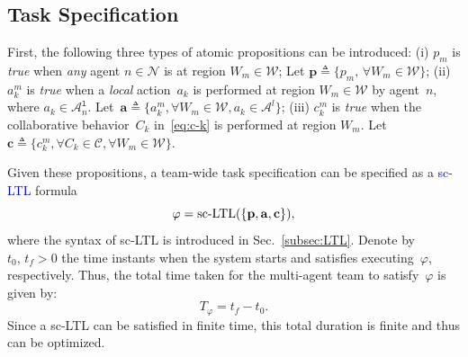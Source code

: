 \subsection{Task Specification}\label{subsec:task-specification}
First, the following three types of atomic propositions can be introduced:
(i) $p_m$ is \emph{true} when \emph{any} agent $n\in \mathcal{N}$ is at region ${W}_m\in {\mathcal{W}}$;
Let $\mathbf{p}\triangleq \{p_m,\, \forall {W}_m \in {\mathcal{W}}\}$;
(ii) $a^m_k$ is \emph{true} when a \emph{local} action~$a_k$ is performed at region ${W}_m\in{\mathcal{W}}$ by
agent~$n$, where $a_k \in \mathcal{A}_n^{\texttt{l}}$.
Let~$\mathbf{a} \triangleq\{a^m_k,\forall {W}_m \in \mathcal{W}, a_k\in \mathcal{A}^{l}\}$;
(iii) $c^m_k$ is \emph{true} when the collaborative behavior~$C_k$ in~\eqref{eq:c-k} is performed at region $W_m$.
Let $\mathbf{c} \triangleq\{c^m_k,\forall C_k \in \mathcal{C},\forall {W}_m \in {\mathcal{W}}\}$.

Given these propositions, a team-wide task specification can be specified as a \textcolor{blue}{sc-LTL} formula
\begin{equation}\label{eq:task}
\varphi=\textup{sc-LTL}(\{\mathbf{p}, \mathbf{a}, \mathbf{c}\}),
\end{equation}
where the syntax of sc-LTL is introduced in Sec.~\ref{subsec:LTL}.
Denote by~$t_0,\, t_f>0$ the time instants when the system starts
and satisfies executing~$\varphi$, respectively.
Thus, the total time taken for the multi-agent team to satisfy~$\varphi$ is given by:
\begin{equation}\label{eq:task-freq}
T_\varphi = t_f-t_0.
\end{equation}
Since a sc-LTL can be satisfied in finite time, this total duration is finite and thus can be optimized.


